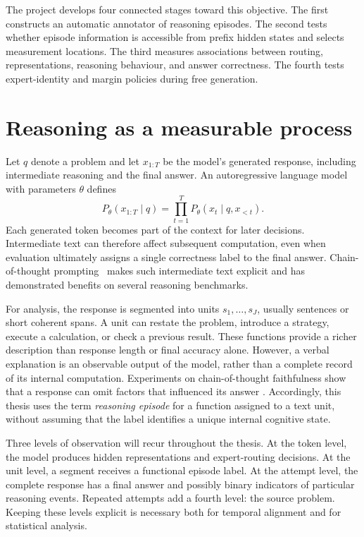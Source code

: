 \documentclass[12pt,a4paper,twoside,openright]{book}
\begin{document}
The project develops four connected stages toward this objective. The first
constructs an automatic annotator of reasoning episodes. The second tests
whether episode information is accessible from prefix hidden states and
selects measurement locations. The third measures associations between
routing, representations, reasoning behaviour, and answer correctness. The
fourth tests expert-identity and margin policies during free generation.

\section{Reasoning as a measurable process}
\label{sec:reasoning-process}

Let $q$ denote a problem and let $x_{1:T}$ be the model's generated response,
including intermediate reasoning and the final answer. An autoregressive
language model with parameters $\theta$ defines
\begin{equation}
  P_\theta(x_{1:T}\mid q)
  = \prod_{t=1}^{T} P_\theta(x_t\mid q,x_{<t}).
  \label{eq:autoregressive}
\end{equation}
Each generated token becomes part of the context for later decisions.
Intermediate text can therefore affect subsequent computation, even when
evaluation ultimately assigns a single correctness label to the final answer.
Chain-of-thought prompting~\cite{wei2022cot} makes such intermediate text
explicit and has demonstrated benefits on several reasoning benchmarks.

For analysis, the response is segmented into units $s_1,\ldots,s_J$, usually
sentences or short coherent spans. A unit can restate the problem, introduce a
strategy, execute a calculation, or check a previous result. These functions
provide a richer description than response length or final accuracy alone.
However, a verbal explanation is an observable output of the model, rather
than a complete record of its internal computation. Experiments on
chain-of-thought faithfulness show that a response can omit factors that
influenced its answer \cite{turpin2023unfaithful}. Accordingly, this thesis
uses the term \emph{reasoning episode} for a function assigned to a text unit,
without assuming that the label identifies a unique internal cognitive state.

Three levels of observation will recur throughout the thesis. At the token
level, the model produces hidden representations and expert-routing
decisions. At the unit level, a segment receives a functional episode label.
At the attempt level, the complete response has a final answer and possibly
binary indicators of particular reasoning events. Repeated attempts add a
fourth level: the source problem. Keeping these levels explicit is necessary
both for temporal alignment and for statistical analysis.
\end{document}
